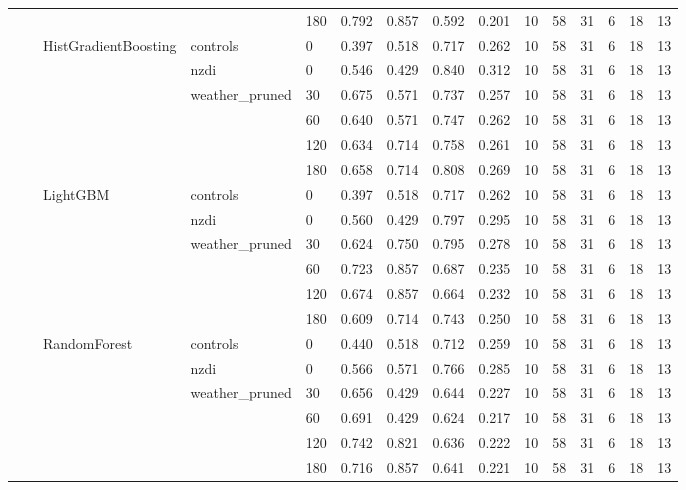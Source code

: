 \begin{longtable}{lllllrrrrrrrrrr}
 &  &  &  & 180 & 0.792 & 0.857 & 0.592 & 0.201 & 10 & 58 & 31 & 6 & 18 & 13 \\
\cline{3-15} \cline{4-15}
 &  & \multirow[t]{6}{*}{HistGradientBoosting} & controls & 0 & 0.397 & 0.518 & 0.717 & 0.262 & 10 & 58 & 31 & 6 & 18 & 13 \\
\cline{4-15}
 &  &  & nzdi & 0 & 0.546 & 0.429 & 0.840 & 0.312 & 10 & 58 & 31 & 6 & 18 & 13 \\
\cline{4-15}
 &  &  & \multirow[t]{4}{*}{weather_pruned} & 30 & 0.675 & 0.571 & 0.737 & 0.257 & 10 & 58 & 31 & 6 & 18 & 13 \\
 &  &  &  & 60 & 0.640 & 0.571 & 0.747 & 0.262 & 10 & 58 & 31 & 6 & 18 & 13 \\
 &  &  &  & 120 & 0.634 & 0.714 & 0.758 & 0.261 & 10 & 58 & 31 & 6 & 18 & 13 \\
 &  &  &  & 180 & 0.658 & 0.714 & 0.808 & 0.269 & 10 & 58 & 31 & 6 & 18 & 13 \\
\cline{3-15} \cline{4-15}
 &  & \multirow[t]{6}{*}{LightGBM} & controls & 0 & 0.397 & 0.518 & 0.717 & 0.262 & 10 & 58 & 31 & 6 & 18 & 13 \\
\cline{4-15}
 &  &  & nzdi & 0 & 0.560 & 0.429 & 0.797 & 0.295 & 10 & 58 & 31 & 6 & 18 & 13 \\
\cline{4-15}
 &  &  & \multirow[t]{4}{*}{weather_pruned} & 30 & 0.624 & 0.750 & 0.795 & 0.278 & 10 & 58 & 31 & 6 & 18 & 13 \\
 &  &  &  & 60 & 0.723 & 0.857 & 0.687 & 0.235 & 10 & 58 & 31 & 6 & 18 & 13 \\
 &  &  &  & 120 & 0.674 & 0.857 & 0.664 & 0.232 & 10 & 58 & 31 & 6 & 18 & 13 \\
 &  &  &  & 180 & 0.609 & 0.714 & 0.743 & 0.250 & 10 & 58 & 31 & 6 & 18 & 13 \\
\cline{3-15} \cline{4-15}
 &  & \multirow[t]{6}{*}{RandomForest} & controls & 0 & 0.440 & 0.518 & 0.712 & 0.259 & 10 & 58 & 31 & 6 & 18 & 13 \\
\cline{4-15}
 &  &  & nzdi & 0 & 0.566 & 0.571 & 0.766 & 0.285 & 10 & 58 & 31 & 6 & 18 & 13 \\
\cline{4-15}
 &  &  & \multirow[t]{4}{*}{weather_pruned} & 30 & 0.656 & 0.429 & 0.644 & 0.227 & 10 & 58 & 31 & 6 & 18 & 13 \\
 &  &  &  & 60 & 0.691 & 0.429 & 0.624 & 0.217 & 10 & 58 & 31 & 6 & 18 & 13 \\
 &  &  &  & 120 & 0.742 & 0.821 & 0.636 & 0.222 & 10 & 58 & 31 & 6 & 18 & 13 \\
 &  &  &  & 180 & 0.716 & 0.857 & 0.641 & 0.221 & 10 & 58 & 31 & 6 & 18 & 13 \\

\end{longtable}
